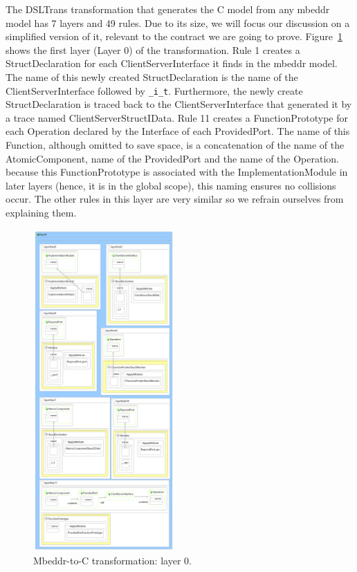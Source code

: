 The DSLTrans transformation that generates the C model from any mbeddr model has
 7 layers and 49 rules. Due to its size, we will focus our discussion on a
simplified version of it, relevant to the contract we are going to prove.
Figure~\ref{fig:mb2c_layer_0} shows the first layer (Layer 0) of the
transformation. Rule 1 creates a StructDeclaration for each
ClientServerInterface it finds in the mbeddr model.
The name of this newly created StructDeclaration is the name of the
ClientServerInterface followed by \verb=_i_t=.
Furthermore, the newly create StructDeclaration is traced back to the
ClientServerInterface that generated it by a trace named
ClientServerStructIData.
Rule 11 creates a FunctionPrototype for each Operation declared by the
Interface of each ProvidedPort. The name of this Function, although omitted to
save space, is a concatenation of the name of the AtomicComponent, name of the
ProvidedPort and the name of the Operation. because this FunctionPrototype is
associated with the ImplementationModule in later layers (hence, it is in the
global scope), this naming ensures no collisions occur.
The other rules in this layer are very similar so we refrain ourselves from
explaining them.

\begin{figure}
\begin{center}
  \includegraphics[width=0.48\textwidth]{figures/mbeddr/mbeddr2C_optimized_layer_0}
  \caption{Mbeddr-to-C transformation: layer 0.}
  \label{fig:mb2c_layer_0}
\end{center}
\end{figure}

